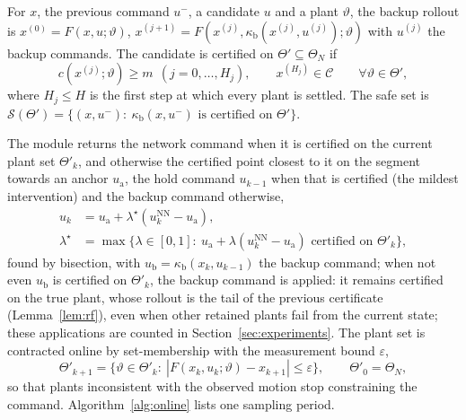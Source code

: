 \begin{definition}\label{def:cert}
For $x$, the previous command $u^-$, a candidate $u$ and a plant $\vartheta$, the backup rollout is $x^{(0)}=F(x,u;\vartheta)$, $x^{(j+1)}=F(x^{(j)},\kappa_{\mathrm b}(x^{(j)},u^{(j)});\vartheta)$ with $u^{(j)}$ the backup commands. The candidate is certified on $\Theta'\subseteq\Theta_N$ if
\begin{equation}\label{eq:cert}
c(x^{(j)};\vartheta)\ge m\ \ (j=0,\dots,H_j),\qquad x^{(H_j)}\in\mathcal C\qquad\forall\vartheta\in\Theta',
\end{equation}
where $H_j\le H$ is the first step at which every plant is settled. The safe set is $\mathcal S(\Theta')=\{(x,u^-):\ \kappa_{\mathrm b}(x,u^-)\text{ is certified on }\Theta'\}$.
\end{definition}
The module returns the network command when it is certified on the current plant set $\Theta'_k$, and otherwise the certified point closest to it on the segment towards an anchor $u_{\mathrm a}$, the hold command $u_{k-1}$ when that is certified (the mildest intervention) and the backup command otherwise,
\begin{equation}\label{eq:filter}
\begin{aligned}u_k&=u_{\mathrm a}+\lambda^\star(u^{\mathrm{NN}}_k-u_{\mathrm a}),\\ \lambda^\star&=\max\{\lambda\in[0,1]:\ u_{\mathrm a}+\lambda(u^{\mathrm{NN}}_k-u_{\mathrm a})\text{ certified on }\Theta'_k\},\end{aligned}
\end{equation}
found by bisection, with $u_{\mathrm b}=\kappa_{\mathrm b}(x_k,u_{k-1})$ the backup command; when not even $u_{\mathrm b}$ is certified on $\Theta'_k$, the backup command is applied: it remains certified on the true plant, whose rollout is the tail of the previous certificate (Lemma~\ref{lem:rf}), even when other retained plants fail from the current state; these applications are counted in Section~\ref{sec:experiments}. The plant set is contracted online by set-membership with the measurement bound $\varepsilon$,
\begin{equation}\label{eq:consistent}
\Theta'_{k+1}=\{\vartheta\in\Theta'_k:\ |F(x_k,u_k;\vartheta)-x_{k+1}|\le\varepsilon\},\qquad \Theta'_0=\Theta_N,
\end{equation}
so that plants inconsistent with the observed motion stop constraining the command. Algorithm~\ref{alg:online} lists one sampling period.

